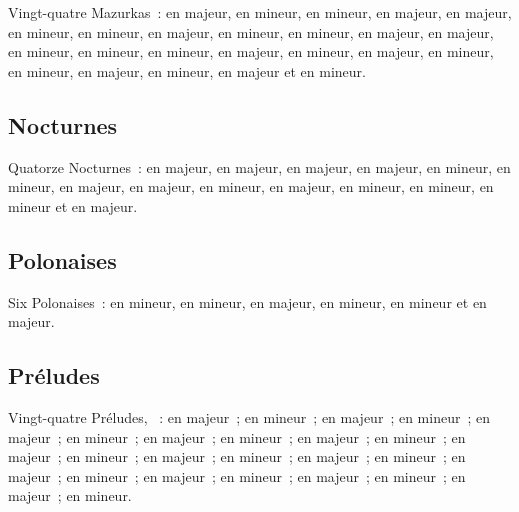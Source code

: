 Vingt-quatre Mazurkas~:   en \kE majeur, 
 en \kE \Flat mineur,   en \kF mineur, 
 en \kB \Flat majeur,   en \kA \Flat majeur,
  en \kG mineur,   en \kB mineur,
  en \kD \Flat majeur,   en \kC \Sharp
mineur,   en \kG \Sharp mineur,   en
\kD majeur,   en \kC majeur,   en \kB
mineur,   en \kC \Sharp mineur,   en
\kE mineur,   en \kA \Flat majeur,  
en \kC \Sharp mineur,   en \kB majeur, 
 en \kF mineur,   en \kA mineur, 
 en \kC majeur,   en \kA mineur, 
 en \kF majeur et   en \kF mineur.

\subsection{Nocturnes}

Quatorze Nocturnes~:   en \kE \Flat majeur, 
 en \kB majeur,   en \kF majeur, 
 en \kF \Sharp majeur,   en \kG mineur,
  en \kC \Sharp mineur,   en \kD \Flat
majeur,   en \kB majeur,   en \kG
mineur,   en \kG majeur,   en \kC
mineur,   en \kF \Sharp mineur,   en
\kF mineur et   en \kE majeur.

\subsection{Polonaises}

Six Polonaises~:   en \kC \Sharp mineur, 
 en \kE \Flat mineur,   en \kA majeur,
  en \kC mineur,  en \kF \Sharp mineur et
 en \kA \Flat majeur.

\subsection{Préludes}

Vingt-quatre Préludes, ~:  en \kC majeur~;  en
\kA mineur~;  en \kG majeur~;  en \kE mineur~;
 en \kD majeur~;  en \kB mineur~;  en \kA
majeur~;  en \kF \Sharp mineur~;  en \kE majeur~;
 en \kC \Sharp mineur~;  en \kB majeur~; 
en \kG \Sharp mineur~;  en \kF \Sharp majeur~;  en \kE
\Flat mineur~;  en \kD \Flat majeur~;  en \kB \Flat
mineur~;  en \kA \Flat majeur~;  en \kF mineur~;
 en \kE \Flat majeur~;  en \kC mineur~;  en
\kB \Flat majeur~;  en \kG mineur~;  en \kF majeur~;
 en \kD mineur.

